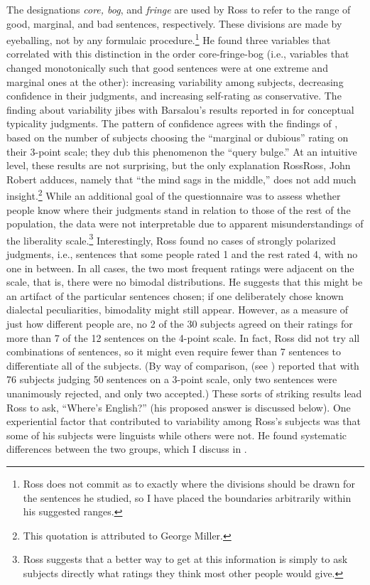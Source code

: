 The designations \textit{core, bog}, and \textit{fringe} are used by Ross to refer to the range of good, marginal, and bad sentences, respectively. These divisions are made by eyeballing, not by any formulaic procedure.\footnote{Ross does not commit as to exactly where the divisions should be drawn for the sentences he studied, so I have placed the boundaries arbitrarily within his suggested ranges.}
 He found three variables that correlated with this distinction in the order core-fringe-bog (i.e., variables that changed monotonically such that good sentences were at one extreme and marginal ones at the other): increasing variability among subjects, decreasing confidence in their judgments, and increasing self-rating as conservative. The finding about variability jibes with Barsalou's results reported in  for conceptual typicality judgments. The pattern of confidence agrees with the findings of \citet[52, fig. 9]{QuirkEtAl1966}, based on the number of subjects choosing the ``marginal or dubious'' rating on their 3-point scale; they dub this phenomenon the ``query bulge.'' At an intuitive level, these results are not surprising, but the only explanation Ross{Ross, John Robert} adduces, namely that ``the mind sags in the middle,'' does not add much insight.\footnote{This quotation is attributed to George Miller.}
 While an additional goal of the questionnaire was to assess whether people know where their judgments stand in relation to those of the rest
of the population, the data were not interpretable due to apparent misunderstandings of the liberality scale.\footnote{Ross suggests that a better way to get at this information is simply to ask subjects directly what ratings they think most other people would give.}
 Interestingly, Ross found no cases of strongly polarized judgments, i.e., sentences that some people rated 1 and the rest rated 4, with no one in between. In all cases, the two most frequent ratings were adjacent on the scale, that is, there were no bimodal distributions. He suggests that this might be an artifact of the particular sentences chosen; if one deliberately chose known dialectal peculiarities, bimodality might still appear. However, as a measure of just how different people are, no 2 of the 30 subjects agreed on their ratings for more than 7 of the 12 sentences on the 4-point scale. In fact, Ross did not try all combinations of sentences, so it might even require fewer than 7 sentences to differentiate all of the subjects. (By way of comparison, \citet{QuirkEtAl1966} (see )
 reported that with 76 subjects judging  50 sentences on a 3-point scale, only two sentences were unanimously rejected, and only two accepted.) These sorts of striking results lead Ross to ask, ``Where's English?'' (his proposed answer is discussed below). One experiential factor that contributed to variability among Ross's subjects was that some of his subjects were linguists while others were not. He found systematic differences between the two groups, which I discuss in .

